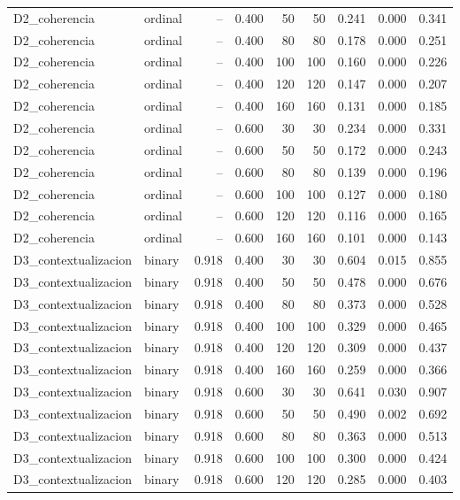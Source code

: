 \begin{table}
{\begin{tabular}{llrrrrrrr}
D2\_coherencia & ordinal & -- & 0.400 & 50 & 50 & 0.241 & 0.000 & 0.341 \\
D2\_coherencia & ordinal & -- & 0.400 & 80 & 80 & 0.178 & 0.000 & 0.251 \\
D2\_coherencia & ordinal & -- & 0.400 & 100 & 100 & 0.160 & 0.000 & 0.226 \\
D2\_coherencia & ordinal & -- & 0.400 & 120 & 120 & 0.147 & 0.000 & 0.207 \\
D2\_coherencia & ordinal & -- & 0.400 & 160 & 160 & 0.131 & 0.000 & 0.185 \\
D2\_coherencia & ordinal & -- & 0.600 & 30 & 30 & 0.234 & 0.000 & 0.331 \\
D2\_coherencia & ordinal & -- & 0.600 & 50 & 50 & 0.172 & 0.000 & 0.243 \\
D2\_coherencia & ordinal & -- & 0.600 & 80 & 80 & 0.139 & 0.000 & 0.196 \\
D2\_coherencia & ordinal & -- & 0.600 & 100 & 100 & 0.127 & 0.000 & 0.180 \\
D2\_coherencia & ordinal & -- & 0.600 & 120 & 120 & 0.116 & 0.000 & 0.165 \\
D2\_coherencia & ordinal & -- & 0.600 & 160 & 160 & 0.101 & 0.000 & 0.143 \\
D3\_contextualizacion & binary & 0.918 & 0.400 & 30 & 30 & 0.604 & 0.015 & 0.855 \\
D3\_contextualizacion & binary & 0.918 & 0.400 & 50 & 50 & 0.478 & 0.000 & 0.676 \\
D3\_contextualizacion & binary & 0.918 & 0.400 & 80 & 80 & 0.373 & 0.000 & 0.528 \\
D3\_contextualizacion & binary & 0.918 & 0.400 & 100 & 100 & 0.329 & 0.000 & 0.465 \\
D3\_contextualizacion & binary & 0.918 & 0.400 & 120 & 120 & 0.309 & 0.000 & 0.437 \\
D3\_contextualizacion & binary & 0.918 & 0.400 & 160 & 160 & 0.259 & 0.000 & 0.366 \\
D3\_contextualizacion & binary & 0.918 & 0.600 & 30 & 30 & 0.641 & 0.030 & 0.907 \\
D3\_contextualizacion & binary & 0.918 & 0.600 & 50 & 50 & 0.490 & 0.002 & 0.692 \\
D3\_contextualizacion & binary & 0.918 & 0.600 & 80 & 80 & 0.363 & 0.000 & 0.513 \\
D3\_contextualizacion & binary & 0.918 & 0.600 & 100 & 100 & 0.300 & 0.000 & 0.424 \\
D3\_contextualizacion & binary & 0.918 & 0.600 & 120 & 120 & 0.285 & 0.000 & 0.403 \\

\end{tabular}}
\end{table}
